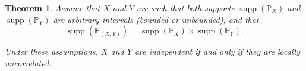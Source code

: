 \documentclass[sn-mathphys,Numbered,11pt]{sn-jnl}%
\theoremstyle{thmstyleone}%
\newtheorem{theorem}{Theorem}%
\newcommand{\eps}{\varepsilon}
\newcommand{\R}{\mathbb{R}}
\newcommand{\PP}{\mathbb{P}}
\newcommand{\supp}{\operatorname{supp}}
\begin{document}
\begin{theorem}\label{LLL}
Assume that $X$ and $Y$ are such that both supports $\supp(\PP_{X})$ and $\supp(\PP_{Y})$ are arbitrary intervals (bounded or unbounded), and that
\begin{equation}\label{ZAL}\supp(\PP_{(X,Y)}) = \supp(\PP_{X})\times \supp(\PP_{Y}).
\end{equation}


Under these assumptions, $X$ and $Y$ are independent if and only if they are locally uncorrelated.
\end{theorem}
\end{document}
